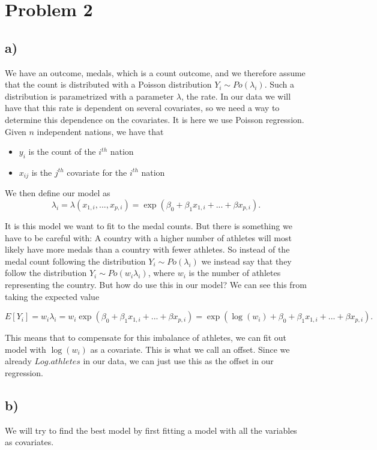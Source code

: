 \documentclass[a4paper,norsk, 10pt]{article}
\begin{document}
\section{Problem 2}
\subsection{a)}
We have an outcome, medals, which is a count outcome, and we therefore assume that the count is distributed with a Poisson distribution $Y_i \sim Po(\lambda_i)$. Such a distribution is parametrized with a parameter $\lambda$, the rate. In our data we will have that this rate is dependent on several covariates, so we need a way to determine this dependence on the covariates. It is here we use Poisson regression. Given $n$ independent nations, we have that 
\begin{itemize}
\item $y_i$ is the count of the $i^{th}$ nation
\item $x_{ij}$ is the $j^{th}$ covariate for the $i^{th}$ nation
\end{itemize}
We then define our model as 
\begin{equation}
\lambda_i = \lambda(x_{1,i},...,x_{p,i}) = \exp(\beta_0 + \beta_1 x_{1,i} + ... + \beta x_{p,i}).
\end{equation}

It is this model we want to fit to the medal counts. But there is something we have to be careful with: A country with a higher number of athletes will most likely have more medals than a country with fewer athletes. So instead of the medal count following the distribution $Y_i \sim Po(\lambda_i)$ we instead say that they follow the distribution $Y_i \sim Po(w_i\lambda_i)$, where $w_i$ is the number of athletes representing the country. But how do use this in our model? We can see this from taking the expected value

\begin{equation}
E[Y_i] = w_i \lambda_i = w_i\exp(\beta_0 + \beta_1 x_{1,i} + ... + \beta x_{p,i}) = \exp(\log(w_i) + \beta_0 + \beta_1 x_{1,i} + ... + \beta x_{p,i}).
\end{equation}

This means that to compensate for this imbalance of athletes, we can fit out model with $\log(w_i)$ as a covariate. This is what we call an offset. Since we already $Log.athletes$ in our data, we can just use this as the offset in our regression.

\subsection{b)}
We will try to find the best model by first fitting a model with all the variables as covariates. 
\end{document}
